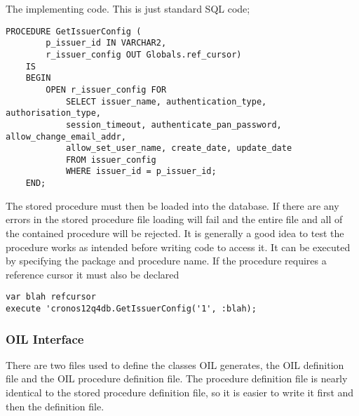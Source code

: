 \documentclass[a4paper, 11pt, titlepage]{article}
\begin{document}
The implementing code. This is just standard SQL code;
\begin{verbatim} 
PROCEDURE GetIssuerConfig ( 
        p_issuer_id IN VARCHAR2, 
        r_issuer_config OUT Globals.ref_cursor) 
    IS 
    BEGIN 
        OPEN r_issuer_config FOR 
            SELECT issuer_name, authentication_type, authorisation_type, 
            session_timeout, authenticate_pan_password, allow_change_email_addr, 
            allow_set_user_name, create_date, update_date 
            FROM issuer_config 
            WHERE issuer_id = p_issuer_id; 
    END; 
\end{verbatim} 
The stored procedure must then be loaded into the database. If there are any errors in the stored procedure file loading will fail and the entire file and all of the contained procedure will be rejected. It is generally a good idea to test the procedure works as intended before writing code to access it. It can be executed by specifying the package and procedure name. If the procedure requires a reference cursor it must also be declared 
\begin{verbatim} 
var blah refcursor 
execute 'cronos12q4db.GetIssuerConfig('1', :blah); 
\end{verbatim} 
 
\subsubsection{OIL Interface} 
There are two files used to define the classes OIL generates, the OIL definition file and the OIL procedure definition file. The procedure definition file is nearly identical to the stored procedure definition file, so it is easier to write it first and then the definition file. 
 
\end{document}
